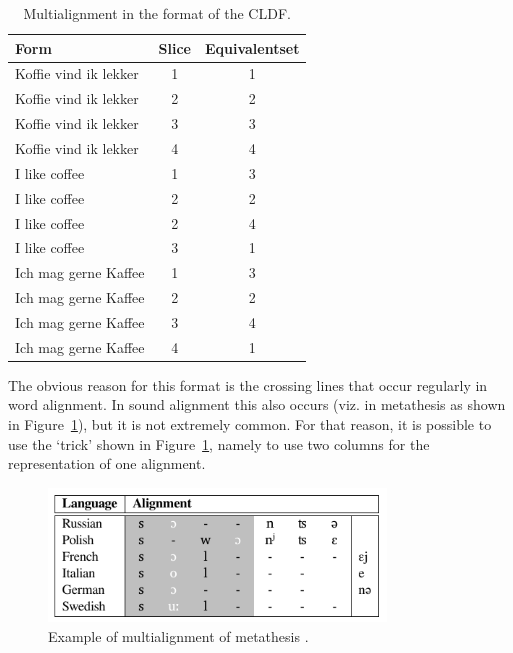 \documentclass[11pt]{article}
\begin{document}
\begin{table}[htbp]
\centering
\begin{tabular}{ l c c }            \hline
 Form & Slice & Equivalentset    \\ \hline
 Koffie vind ik lekker & 1 & 1   \\
 Koffie vind ik lekker & 2 & 2   \\
 Koffie vind ik lekker & 3 & 3   \\
 Koffie vind ik lekker & 4 & 4   \\ \hline
 I like coffee         & 1 & 3   \\
 I like coffee         & 2 & 2   \\
 I like coffee         & 2 & 4   \\
 I like coffee         & 3 & 1   \\ \hline
 Ich mag gerne Kaffee  & 1 & 3   \\
 Ich mag gerne Kaffee  & 2 & 2   \\
 Ich mag gerne Kaffee  & 3 & 4   \\
 Ich mag gerne Kaffee  & 4 & 1   \\ \hline
\end{tabular}
\caption{Multialignment in the format of the CLDF.}
\label{tab:cldf_paralleltext}
\end{table}

The obvious reason for this format is the crossing lines that occur regularly in word alignment. In sound alignment this also occurs (viz. in metathesis as shown in Figure~\ref{fig:metathesis_list}), but it is not extremely common. For that reason, it is possible to use the `trick' shown in Figure~\ref{fig:metathesis_list}, namely to use two columns for the representation of one alignment.

\begin{figure}[htbp]
  \centering
  \includegraphics[width=0.8\textwidth]{images/metathesis_list.pdf}
  \caption{Example of multialignment of metathesis \parencite[135]{list2014}.}
  \label{fig:metathesis_list}
\end{figure}
\end{document}
